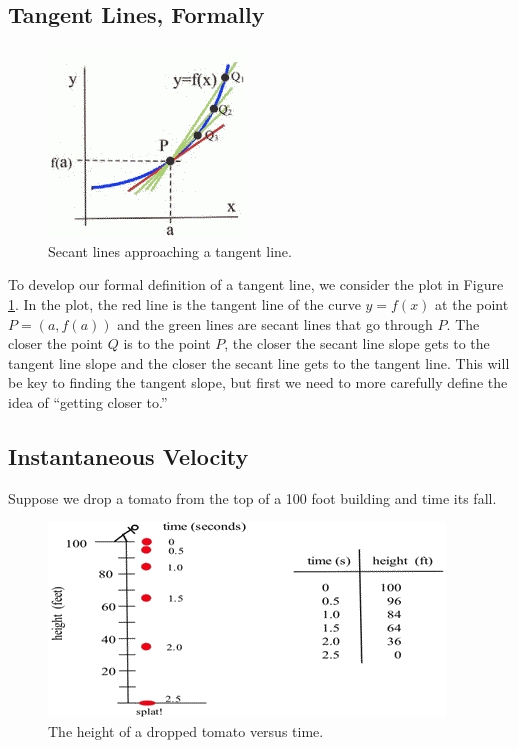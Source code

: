\subsection{Tangent Lines, Formally}
\begin{figure}
  \vspace{-20pt}
    \centering
    \includegraphics{img/chap2/image112.png}
    \caption{Secant lines approaching a tangent line.}
\label{fig:2-2-secants}
\end{figure}

To develop our formal definition of a tangent line, we consider the plot in Figure \ref{fig:2-2-secants}. In the plot, the red line is the tangent line of the curve $y=f(x)$ at the point $P = (a, f(a))$ and the green lines are secant lines that go through $P$. The closer the point $Q$ is to the point $P$, the closer the secant line slope gets to the tangent line slope and the closer the secant line gets to the tangent line. This will be key to finding the tangent slope, but first we need to more carefully define the idea of ``getting closer to.''

\subsection*{Instantaneous Velocity} 

Suppose we drop a tomato from the top of a 100 foot building and time its fall.
\begin{figure}
  \vspace{-20pt}
    \centering
    \includegraphics{img/chap2/image003.png}
    \caption{The height of a dropped tomato versus time.}
\label{fig:2-2-tomato}
\end{figure}

